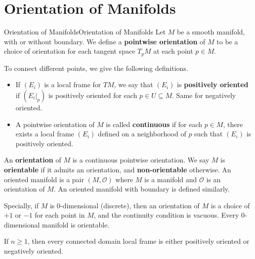 \documentclass[../main.tex]{subfiles}
\begin{document}
\section{Orientation of Manifolds}
\begin{definition}{Orientation of Manifolds}{Orientation of Manifolds}
  Let $M$ be a smooth manifold, with or without boundary. We define a \textbf{pointwise orientation} of $M$ to be a choice of orientation for each tangent space $T_pM$ at each point $p \in M$.

  To connect different points, we give the following definitions.
  \begin{itemize}
    \item If $(E_i)$ is a local frame for $TM$, we say that $(E_i)$ is \textbf{positively oriented} if $(E_i|_p)$ is positively oriented for each $p \in U \subseteq M$. Same for negatively oriented.
    \item A pointwise orientation of $M$ is called \textbf{continuous} if for each $p \in M$, there exists a local frame $(E_i)$ defined on a neighborhood of $p$ such that $(E_i)$ is positively oriented.
  \end{itemize}
  An \textbf{orientation} of $M$ is a continuous pointwise orientation. We say $M$ is \textbf{orientable} if it admits an orientation, and \textbf{non-orientable} otherwise. An oriented manifold is a pair $(M, \mathcal{O})$ where $M$ is a manifold and $\mathcal{O}$ is an orientation of $M$. An oriented manifold with boundary is defined similarly.
\end{definition}

Specially, if $M$ is 0-dimensional (discrete), then an orientation of $M$ is a choice of $+1$ or $-1$ for each point in $M$, and the continuity condition is vacuous. Every 0-dimensional manifold is orientable.

If $n \geq 1$, then every connected domain local frame is either positively oriented or negatively oriented.
\end{document}
